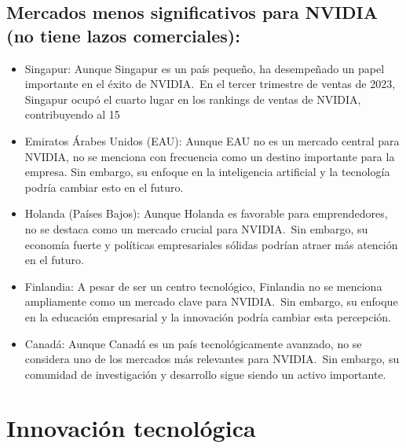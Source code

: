 \documentclass[letterpaper, 12pt]{article}
\begin{document}
\subsection*{Mercados menos significativos para NVIDIA (no tiene lazos comerciales):}

\begin{itemize}
      \item Singapur:
            Aunque Singapur es un país pequeño, ha desempeñado un
            papel importante en el éxito de NVIDIA.~En el tercer trimestre de
            ventas de 2023, Singapur ocupó el cuarto lugar en los rankings de ventas
            de NVIDIA, contribuyendo al 15%

      \item Emiratos Árabes Unidos (EAU):
            Aunque EAU no es un mercado central
            para NVIDIA, no se menciona con frecuencia como un destino importante
            para la empresa. Sin embargo, su enfoque en la inteligencia artificial y
            la tecnología podría cambiar esto en el futuro.

      \item Holanda (Países Bajos):
            Aunque Holanda es favorable para
            emprendedores, no se destaca como un mercado crucial para NVIDIA.~Sin
            embargo, su economía fuerte y políticas empresariales sólidas podrían
            atraer más atención en el futuro.

      \item Finlandia:
            A pesar de ser un centro tecnológico, Finlandia no se
            menciona ampliamente como un mercado clave para NVIDIA.~Sin embargo,
            su enfoque en la educación empresarial y la innovación podría
            cambiar esta percepción.

      \item Canadá:
            Aunque Canadá es un país tecnológicamente avanzado, no se
            considera uno de los mercados más relevantes para NVIDIA.~Sin embargo, su
            comunidad de investigación y desarrollo sigue siendo un activo importante.

\end{itemize}

\section{Innovación tecnológica}
\end{document}
